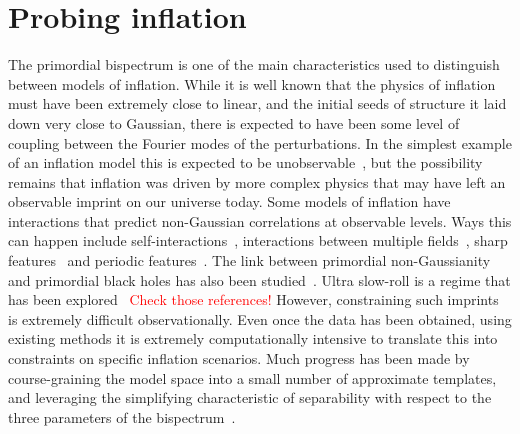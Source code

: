 %
\chapter{Probing inflation}\label{chapter:intro_bispectra}
The primordial bispectrum is one of the main
characteristics used to distinguish between models of inflation. While it is well
known that the physics of inflation must have been extremely close
to linear, and the initial seeds of structure it laid down
very close to Gaussian, there is expected to have been some level of coupling
between the Fourier modes of the perturbations.
In the simplest example of an inflation model this is
expected to be unobservable~\cite{Maldacena},
but the possibility remains that inflation was driven by
more complex physics that may have left an observable imprint on our universe today.
Some models of inflation have interactions that predict non-Gaussian
correlations at observable levels. Ways this can happen include
self-interactions~\cite{px_burrage,dbi_in_the_sky},
interactions between multiple fields~\cite{Byrnes_2010, Gao_turn,
achucarro_multifield1, achucarro_multifield2, achucarro_robust_16, achucarro_natural,
achucarro_quad_viability, achucarro_gsr_cs_14, achucarro_cs_reduction_13,
achucarro_gong_cs_corr, achucarro_cs_12, achucarro_eft, curvaton_comprehensive},
sharp features~\cite{adshead, gsr, step_novaes}
and periodic features~\cite{flauger_pajer_resonant, Pajer_2013, Meerburg_2012, Meerburg_osc, Meerburg_2010,
Barnaby_2011, Peiris_2013, Easther_2013, Cabass_2018, Behbahani_2011}.
The link between primordial non-Gaussianity and primordial black
holes has also been studied~\cite{pbh_byrnes, pbh_young, pbh_franciolini, pbh_passaglia}.
Ultra slow-roll is a regime that has been explored~\cite{usr_chowdhury,usr_pattison,
usr_dimopoulos,usr_martin}
\textcolor{red}{Check those references!}
However, constraining such imprints is extremely difficult observationally.
Even once the data has been obtained, using existing methods it is
extremely computationally intensive to translate this into constraints
on specific inflation scenarios. Much progress has been made by course-graining
the model space into a small number of approximate templates,
and leveraging the simplifying characteristic of separability
with respect to the three parameters of the bispectrum~\cite{Komatsu_2005, Munchmeyer_2014}.


